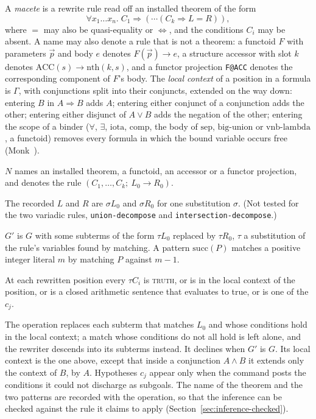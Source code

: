 A \emph{macete} is a rewrite rule read off an installed theorem of the
form
\[
  \forall x_1 \ldots x_n.\; C_1 \Rightarrow (\cdots (C_k \Rightarrow L = R)),
\]
where $=$ may also be quasi-equality or $\Leftrightarrow$, and the
conditions $C_i$ may be absent.  A name may also denote a rule that is
not a theorem: a functoid $F$ with parameters $\vec p$ and body $e$
denotes $F(\vec p) \to e$, a structure accessor with slot $k$ denotes
$\mathrm{ACC}(s) \to \mathrm{nth}(k, s)$, and a functor projection
\texttt{F@ACC} denotes the corresponding component of $F$'s body.
The \emph{local context} of a position in a formula is $\Gamma$, with
conjunctions split into their conjuncts, extended on the way down:
entering $B$ in $A \Rightarrow B$ adds $A$; entering either conjunct of a
conjunction adds the other; entering either disjunct of $A \vee B$ adds
the negation of the other; entering the scope of a binder
($\forall$, $\exists$, $\mathrm{iota}$, $\mathrm{comp}$, the body of
$\mathrm{sep}$, $\mathrm{big\text{-}union}$ or $\mathrm{vnb\text{-}lambda}$,
a functoid) removes every formula in which the bound variable occurs
free (Monk~\cite{Monk1988}).
\label{kop:macete}%
\begin{VNBcond}
\item[Licence] $N$ names an installed theorem, a functoid, an accessor
  or a functor projection, and denotes the rule
  $(C_1, \ldots, C_k;\ L_0 \to R_0)$.
\item[Tag] The recorded $L$ and $R$ are $\sigma L_0$ and $\sigma R_0$
  for one substitution $\sigma$.  (Not tested for the two variadic rules,
  \texttt{union-decompose} and \texttt{intersection-decompose}.)
\item[Rewrite] $G'$ is $G$ with some subterms of the form $\tau L_0$
  replaced by $\tau R_0$, $\tau$ a substitution of the rule's variables
  found by matching.  A pattern $\mathrm{succ}(P)$ matches a positive
  integer literal $m$ by matching $P$ against $m-1$.
\item[Conditions] At each rewritten position every $\tau C_i$ is
  \textsc{truth}, or is in the local context of the position, or is a
  closed arithmetic sentence that evaluates to true, or is one of the
  $c_j$.
\end{VNBcond}
The operation replaces each subterm that matches $L_0$ and whose
conditions hold in the local context; a match whose conditions do not
all hold is left alone, and the rewriter descends into its subterms
instead.  It declines when $G'$ is $G$.  Its local context is the one
above, except that inside a conjunction $A \wedge B$ it extends only the
context of $B$, by $A$.  Hypotheses $c_j$ appear only when the command
posts the conditions it could not discharge as subgoals.  The name of
the theorem and the two patterns are recorded with the operation, so
that the inference can be checked against the rule it claims to apply
(Section~\ref{sec:inference-checked}).

